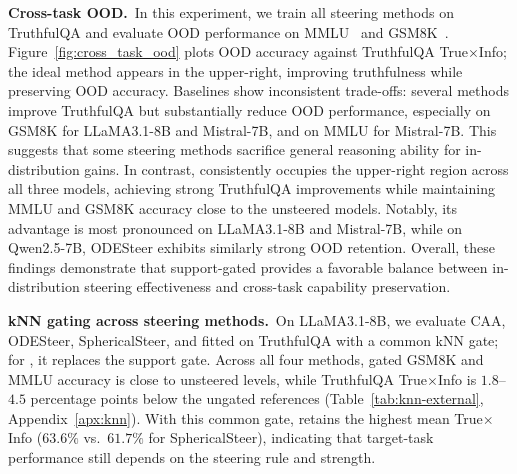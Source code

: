 \noindent\textbf{Cross-task OOD.}~In this experiment, we train all steering methods on TruthfulQA and evaluate OOD performance on MMLU~\cite{hendrycks2020measuring} and GSM8K~\cite{cobbe2021gsm8k}. Figure~\ref{fig:cross_task_ood} plots OOD accuracy against TruthfulQA True$\times$Info; the ideal method appears in the upper-right, improving truthfulness while preserving OOD accuracy. Baselines show inconsistent trade-offs: several methods improve TruthfulQA but substantially reduce OOD performance, especially on GSM8K for LLaMA3.1-8B and Mistral-7B, and on MMLU for Mistral-7B. This suggests that some steering methods sacrifice general reasoning ability for in-distribution gains. In contrast, \Cobras consistently occupies the upper-right region across all three models, achieving strong TruthfulQA improvements while maintaining MMLU and GSM8K accuracy close to the unsteered models. Notably, its advantage is most pronounced on LLaMA3.1-8B and Mistral-7B, while on Qwen2.5-7B, ODESteer exhibits similarly strong OOD retention. Overall, these findings demonstrate that support-gated \Cobras provides a favorable balance between in-distribution steering effectiveness and cross-task capability preservation.


\noindent\textbf{kNN gating across steering methods.}~On LLaMA3.1-8B, we evaluate CAA, ODESteer, SphericalSteer, and \Cobras fitted on TruthfulQA with a common kNN gate; for \Cobras, it replaces the support gate. Across all four methods, gated GSM8K and MMLU accuracy is close to unsteered levels, while TruthfulQA True$\times$Info is $1.8$--$4.5$ percentage points below the ungated references (Table~\ref{tab:knn-external}, Appendix~\ref{apx:knn}). With this common gate, \Cobras retains the highest mean True$\times$Info ($63.6\%$ vs.\ $61.7\%$ for SphericalSteer), indicating that target-task performance still depends on the steering rule and strength.




